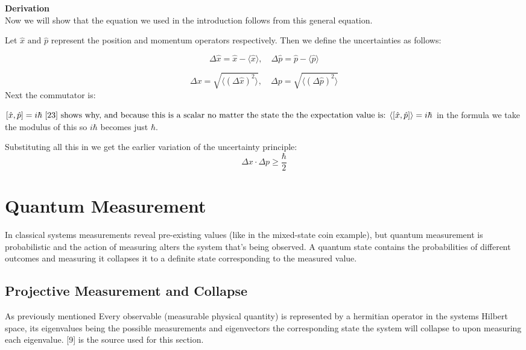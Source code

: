 \noindent\textbf{Derivation}\\
\noindent Now we will show that the equation we used in the introduction follows from this general equation.

\noindent Let \( \hat{x} \text{ and } \hat{p}\) represent the position and momentum operators respectively. Then we define the uncertainties as follows:

\[
\Delta \hat{x} = \hat{x} - \langle \hat{x}\rangle, \quad \Delta \hat{p} = \hat{p} - \langle \hat{p}\rangle
\]

\[
\Delta x = \sqrt{\langle(\Delta \hat{x})^2\rangle}, \quad \Delta p = \sqrt{\langle(\Delta \hat{p})^2\rangle}
\]
\noindent Next the commutator is:

\noindent\([\hat{x}, \hat{p}] = i\hbar\text{ [23] shows why, and because this is a scalar no matter the state the the expectation value is: }\\ \langle [\hat{x}, \hat{p}]\rangle = i\hbar\) in the formula we take the modulus of this so $i\hbar$ becomes just $\hbar$.

\noindent Substituting all this in we get the earlier variation of the uncertainty principle:
\begin{equation}
\Delta x \cdot \Delta p \geq \frac{\hbar}{2}
\end{equation}



\section{Quantum Measurement}
In classical systems measurements reveal pre-existing values (like in the mixed-state coin example), but quantum measurement is probabilistic and the action of measuring alters the system that's being observed. A quantum state contains the probabilities of different outcomes and measuring it collapses it to a definite state corresponding to the measured value.


\subsection{Projective Measurement and Collapse}
As previously mentioned Every observable (measurable physical quantity) is represented by a hermitian operator in the systems Hilbert space, its eigenvalues being the possible measurements and eigenvectors the corresponding state the system will collapse to upon measuring each eigenvalue. [9] is the source used for this section.

